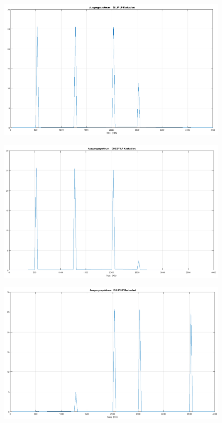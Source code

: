 \begin{figure}[h]
\centering
\includegraphics[width=0.7\linewidth]{Bilder/Attachment_E_ELLIP_LP_Spektrum}
\caption{}
\label{fig:Attachment_E_ELLIP_LP_Spektrum}
\end{figure}

\begin{figure}[h]
\centering
\includegraphics[width=0.7\linewidth]{Bilder/Attachment_E_CHEBY_LP_Spektrum}
\caption{}
\label{fig:Attachment_E_CHEBY_LP_Spektrum}
\end{figure}

\begin{figure}[h]
\centering
\includegraphics[width=0.7\linewidth]{Bilder/Attachment_E_ELLIP_HP_Spektrum}
\caption{}
\label{fig:Attachment_E_ELLIP_HP_Spektrum}
\end{figure}

\clearpage

